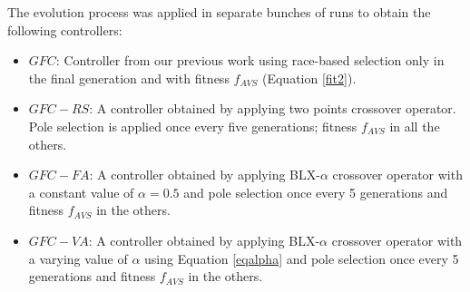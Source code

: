 \documentclass[conference]{IEEEtran}
\begin{document}

The evolution process was applied in separate bunches of runs to obtain the following controllers:
\begin{itemize}
	\item $GFC$: Controller  from our previous work \cite{salem_cig2018} 
using race-based selection only in the final generation and with fitness  $f_{AVS}$ (Equation \ref{fit2}).
	\item $GFC-RS$: A controller obtained by applying two points
          crossover operator. Pole selection is applied once every five
          generations; fitness $f_{AVS}$ in all the others. 
	\item $GFC-FA$: A controller obtained by applying BLX-$\alpha$
          crossover operator with a constant value of $\alpha=0.5$ and
          pole selection once every 5 generations and fitness
          $f_{AVS}$ in the others. 
	\item $GFC-VA$: A controller obtained by applying BLX-$\alpha$
          crossover operator with a varying value of $\alpha$ using
          Equation \ref{eqalpha} and pole selection once every 5
          generations and fitness $f_{AVS}$ in the others. 
\end{itemize}

\end{document}
